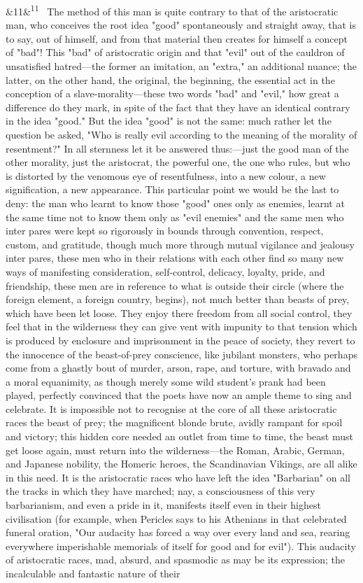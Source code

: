 \documentclass[12pt]{article}
\newcommand{\para}[1][]{\par\noindent\ifx&#1&\else\textsuperscript{\footnotesize #1}~\fi}
\begin{document}
\para[11] The method of this man is quite contrary to that of the aristocratic man, who conceives the root idea "good" spontaneously and straight away, that is to say, out of himself, and from that material then creates for himself a concept of "bad"! This "bad" of aristocratic origin and that "evil" out of the cauldron of unsatisfied hatred---the former an imitation, an "extra," an additional nuance; the latter, on the other hand, the original, the beginning, the essential act in the conception of a slave-morality---these two words "bad" and "evil," how great a difference do they mark, in spite of the fact that they have an identical contrary in the idea "good." But the idea "good" is not the same: much rather let the question be asked, "Who is really evil according to the meaning of the morality of resentment?" In all sternness let it be answered thus:---just the good man of the other morality, just the aristocrat, the powerful one, the one who rules, but who is distorted by the venomous eye of resentfulness, into a new colour, a new signification, a new appearance. This particular point we would be the last to deny: the man who learnt to know those "good" ones only as enemies, learnt at the same time not to know them only as "evil enemies" and the same men who inter pares were kept so rigorously in bounds through convention, respect, custom, and gratitude, though much more through mutual vigilance and jealousy inter pares, these men who in their relations with each other find so many new ways of manifesting consideration, self-control, delicacy, loyalty, pride, and friendship, these men are in reference to what is outside their circle (where the foreign element, a foreign country, begins), not much better than beasts of prey, which have been let loose. They enjoy there freedom from all social control, they feel that in the wilderness they can give vent with impunity to that tension which is produced by enclosure and imprisonment in the peace of society, they revert to the innocence of the beast-of-prey conscience, like jubilant monsters, who perhaps come from a ghastly bout of murder, arson, rape, and torture, with bravado and a moral equanimity, as though merely some wild student's prank had been played, perfectly convinced that the poets have now an ample theme to sing and celebrate. It is impossible not to recognise at the core of all these aristocratic races the beast of prey; the magnificent blonde brute, avidly rampant for spoil and victory; this hidden core needed an outlet from time to time, the beast must get loose again, must return into the wilderness---the Roman, Arabic, German, and Japanese nobility, the Homeric heroes, the Scandinavian Vikings, are all alike in this need. It is the aristocratic races who have left the idea "Barbarian" on all the tracks in which they have marched; nay, a consciousness of this very barbarianism, and even a pride in it, manifests itself even in their highest civilisation (for example, when Pericles says to his Athenians in that celebrated funeral oration, "Our audacity has forced a way over every land and sea, rearing everywhere imperishable memorials of itself for good and for evil"). This audacity of aristocratic races, mad, absurd, and spasmodic as may be its expression; the incalculable and fantastic nature of their 
\end{document}

